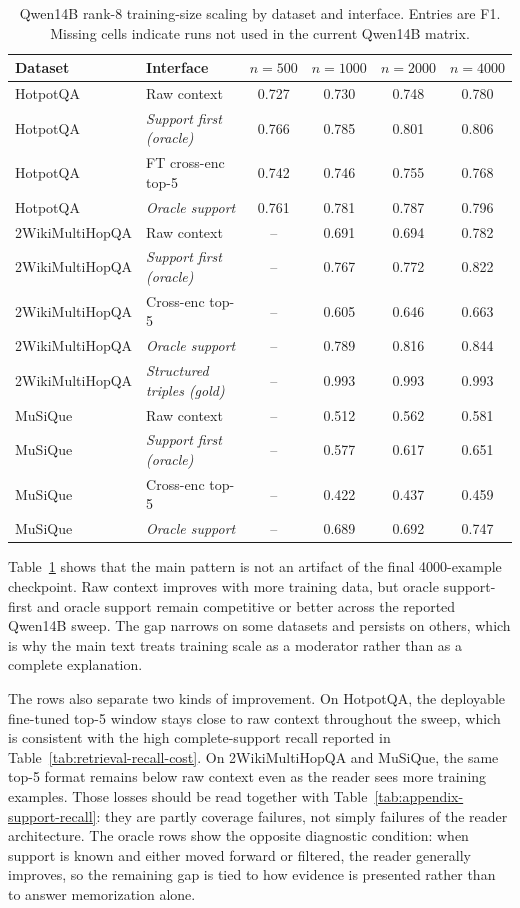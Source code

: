 \documentclass[a4paper,fleqn]{cas-sc}
\begin{document}
\begin{table}[!hbp]
\centering
\caption{Qwen14B rank-8 training-size scaling by dataset and interface. Entries
are F1. Missing cells indicate runs not used in the current Qwen14B matrix.}
\label{tab:appendix-qwen14b-scaling}
\scriptsize
\setlength{\tabcolsep}{3.5pt}
\begin{tabular}{llcccc}
\toprule
Dataset & Interface & $n=500$ & $n=1000$ & $n=2000$ & $n=4000$ \\
\midrule
HotpotQA & Raw context & 0.727 & 0.730 & 0.748 & 0.780 \\
HotpotQA & \emph{Support first (oracle)} & 0.766 & 0.785 & 0.801 & 0.806 \\
HotpotQA & FT cross-enc top-5 & 0.742 & 0.746 & 0.755 & 0.768 \\
HotpotQA & \emph{Oracle support} & 0.761 & 0.781 & 0.787 & 0.796 \\
\midrule
2WikiMultiHopQA & Raw context & -- & 0.691 & 0.694 & 0.782 \\
2WikiMultiHopQA & \emph{Support first (oracle)} & -- & 0.767 & 0.772 & 0.822 \\
2WikiMultiHopQA & Cross-enc top-5 & -- & 0.605 & 0.646 & 0.663 \\
2WikiMultiHopQA & \emph{Oracle support} & -- & 0.789 & 0.816 & 0.844 \\
2WikiMultiHopQA & \emph{Structured triples (gold)} & -- & 0.993 & 0.993 & 0.993 \\
\midrule
MuSiQue & Raw context & -- & 0.512 & 0.562 & 0.581 \\
MuSiQue & \emph{Support first (oracle)} & -- & 0.577 & 0.617 & 0.651 \\
MuSiQue & Cross-enc top-5 & -- & 0.422 & 0.437 & 0.459 \\
MuSiQue & \emph{Oracle support} & -- & 0.689 & 0.692 & 0.747 \\
\bottomrule
\end{tabular}
\end{table}

Table~\ref{tab:appendix-qwen14b-scaling} shows that the main pattern is not an
artifact of the final 4000-example checkpoint. Raw context improves with more
training data, but oracle support-first and oracle support remain competitive or
better across the reported Qwen14B sweep. The gap narrows on some datasets and
persists on others, which is why the main text treats training scale as a
moderator rather than as a complete explanation.

The rows also separate two kinds of improvement. On HotpotQA, the deployable
fine-tuned top-5 window stays close to raw context throughout the sweep, which
is consistent with the high complete-support recall reported in
Table~\ref{tab:retrieval-recall-cost}. On 2WikiMultiHopQA and MuSiQue, the
same top-5 format remains below raw context even as the reader sees more
training examples. Those losses should be read together with
Table~\ref{tab:appendix-support-recall}: they are partly coverage failures,
not simply failures of the reader architecture. The oracle rows show the
opposite diagnostic condition: when support is known and either moved forward
or filtered, the reader generally improves, so the remaining gap is tied to
how evidence is presented rather than to answer memorization alone.
\end{document}
